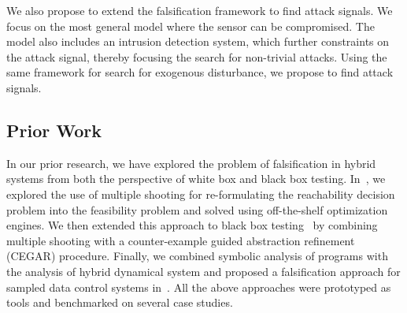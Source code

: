 
We also propose to extend the falsification framework to find attack
signals. We focus on the most general model where the sensor
can be compromised. The model also includes an intrusion detection
system, which further constraints on the attack signal, thereby
focusing the search for non-trivial attacks.
Using the same framework for search for exogenous disturbance, we
propose to find attack signals.

\subsection{Prior Work}

In our prior research, we have explored the problem of falsification
in hybrid systems from both the perspective of white box and black box
testing. In~\cite{Zutshi+Others/2013/Trajectory}, we explored the use
of multiple shooting for re-formulating the reachability decision
problem into the feasibility problem and solved using off-the-shelf
optimization engines. We then extended this approach to black box
testing~\cite{zutshi2014multiple} by combining multiple shooting with
a counter-example guided abstraction refinement (CEGAR) procedure.
Finally, we combined symbolic analysis of programs with the analysis
of hybrid dynamical system and proposed a falsification approach for
sampled data control systems in~\cite{zutshi2016symbolic}. All the
above approaches were prototyped as tools and benchmarked on several
case studies.









